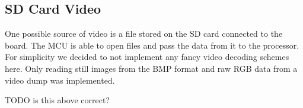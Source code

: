 \subsection{SD Card Video}
One possible source of video is a file stored on the SD card connected to the board.
The MCU is able to open files and pass the data from it to the processor.
For simplicity we decided to not implement any fancy video decoding schemes here.
Only reading still images from the BMP format and raw RGB data from a video dump was implemented.

TODO is this above correct?
